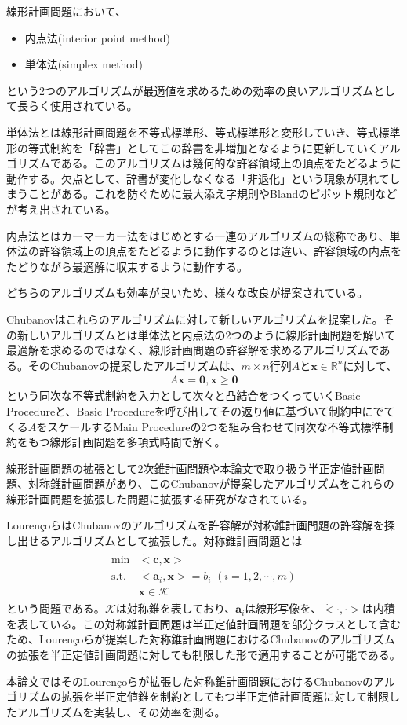 線形計画問題において、
\begin{itemize}
  \item 内点法(interior point method)
  \item 単体法(simplex method)
\end{itemize}
という2つのアルゴリズムが最適値を求めるための効率の良いアルゴリズムとして長らく使用されている。

単体法とは線形計画問題を不等式標準形、等式標準形と変形していき、等式標準形の等式制約を「辞書」としてこの辞書を非増加となるように更新していくアルゴリズムである。このアルゴリズムは幾何的な許容領域上の頂点をたどるように動作する。欠点として、辞書が変化しなくなる「非退化」という現象が現れてしまうことがある。これを防ぐために最大添え字規則やBlandのピボット規則などが考え出されている\cite*{Optimization}。

内点法とはカーマーカー法をはじめとする一連のアルゴリズムの総称であり、単体法の許容領域上の頂点をたどるように動作するのとは違い、許容領域の内点をたどりながら最適解に収束するように動作する。

どちらのアルゴリズムも効率が良いため、様々な改良が提案されている\cite*{InteriorPointMethod}。

Chubanovはこれらのアルゴリズムに対して新しいアルゴリズムを提案した\cite*{Chubanov}。その新しいアルゴリズムとは単体法と内点法の2つのように線形計画問題を解いて最適解を求めるのではなく、線形計画問題の許容解を求めるアルゴリズムである。そのChubanovの提案したアルゴリズムは、$m \times n$行列$A$と$\mathbf{x} \in \mathbb{R}^n$に対して、
\begin{align*}
  A \mathbf{x} = \mathbf{0}, \mathbf{x} \geq \mathbf{0}
\end{align*}
という同次な不等式制約を入力として次々と凸結合をつくっていくBasic Procedureと、Basic Procedureを呼び出してその返り値に基づいて制約中にでてくる$A$をスケールするMain Procedureの2つを組み合わせて同次な不等式標準制約をもつ線形計画問題を多項式時間で解く。

線形計画問題の拡張として2次錐計画問題や本論文で取り扱う半正定値計画問題、対称錐計画問題があり、このChubanovが提案したアルゴリズムをこれらの線形計画問題を拡張した問題に拡張する研究がなされている\cite*{SOCP}\cite*{SymmetricCone}。

Louren\c{c}oらはChubanovのアルゴリズムを許容解が対称錐計画問題の許容解を探し出せるアルゴリズムとして拡張した\cite*{SymmetricCone}。対称錐計画問題とは
\begin{align*}
  \begin{array}{ll}
    \text{min}  & \dot<\mathbf{c}, \mathbf{x}> \\
    \text{s.t.} & \dot<\mathbf{a}_i, \mathbf{x}> = b_i \,\, (i = 1, 2, \cdots, m) \\
                & \mathbf{x} \in \mathcal{K}
  \end{array}
\end{align*}
という問題である。$\mathcal{K}$は対称錐を表しており、$\mathbf{a}_i$は線形写像を、$\dot<\cdot, \cdot>$は内積を表している。この対称錐計画問題は半正定値計画問題を部分クラスとして含むため、Louren\c{c}oらが提案した対称錐計画問題におけるChubanovのアルゴリズムの拡張を半正定値計画問題に対しても制限した形で適用することが可能である。

本論文ではそのLouren\c{c}oらが拡張した対称錐計画問題におけるChubanovのアルゴリズムの拡張を半正定値錐を制約としてもつ半正定値計画問題に対して制限したアルゴリズムを実装し、その効率を測る。
